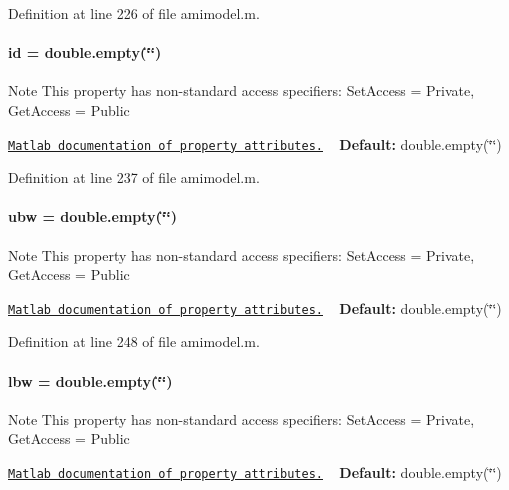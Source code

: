 Definition at line 226 of file amimodel.\+m.

\hypertarget{classamimodel_acf2488b95c97e0378c9bf49de3b50f28}{}
\paragraph[{id}]{\setlength{\rightskip}{0pt plus 5cm}id = double.\+empty(\char`\"{}\char`\"{})}\label{classamimodel_acf2488b95c97e0378c9bf49de3b50f28}
\begin{DoxyNote}{Note}
This property has non-\/standard access specifiers\+: {\ttfamily Set\+Access = Private, Get\+Access = Public} 

\href{http://www.mathworks.com/help/matlab/matlab_oop/property-attributes.html}{\tt Matlab documentation of property attributes.} ~\newline
{\bfseries Default\+:} double.\+empty(\char`\"{}\char`\"{}) 
\end{DoxyNote}


Definition at line 237 of file amimodel.\+m.

\hypertarget{classamimodel_a955c9d10635afed4ebc04c60010e5d40}{}
\paragraph[{ubw}]{\setlength{\rightskip}{0pt plus 5cm}ubw = double.\+empty(\char`\"{}\char`\"{})}\label{classamimodel_a955c9d10635afed4ebc04c60010e5d40}
\begin{DoxyNote}{Note}
This property has non-\/standard access specifiers\+: {\ttfamily Set\+Access = Private, Get\+Access = Public} 

\href{http://www.mathworks.com/help/matlab/matlab_oop/property-attributes.html}{\tt Matlab documentation of property attributes.} ~\newline
{\bfseries Default\+:} double.\+empty(\char`\"{}\char`\"{}) 
\end{DoxyNote}


Definition at line 248 of file amimodel.\+m.

\hypertarget{classamimodel_a784f5fb2b8eda576179be087c2a09a39}{}
\paragraph[{lbw}]{\setlength{\rightskip}{0pt plus 5cm}lbw = double.\+empty(\char`\"{}\char`\"{})}\label{classamimodel_a784f5fb2b8eda576179be087c2a09a39}
\begin{DoxyNote}{Note}
This property has non-\/standard access specifiers\+: {\ttfamily Set\+Access = Private, Get\+Access = Public} 

\href{http://www.mathworks.com/help/matlab/matlab_oop/property-attributes.html}{\tt Matlab documentation of property attributes.} ~\newline
{\bfseries Default\+:} double.\+empty(\char`\"{}\char`\"{}) 
\end{DoxyNote}


